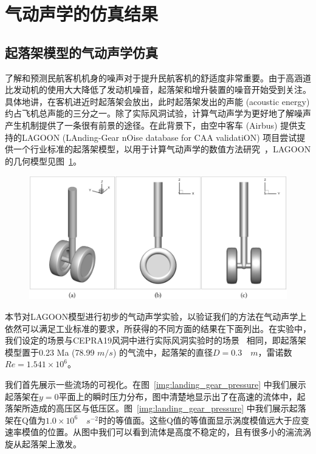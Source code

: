 \section{气动声学的仿真结果}
\subsection{起落架模型的气动声学仿真}
了解和预测民航客机机身的噪声对于提升民航客机的舒适度非常重要。由于高涵道比发动机的使用大大降低了发动机噪音，起落架和增升裝置的噪音开始受到关注。具体地讲，在客机进近时起落架会放出，此时起落架发出的声能 (acoustic energy) 约占飞机总声能的三分之一。除了实际风洞试验，计算气动声学为更好地了解噪声产生机制提供了一条很有前景的途径。在此背景下，由空中客车 (Airbus) 提供支持的LAGOON (LAnding-Gear nOise database for CAA validatiON) 项目尝试提供一个行业标准的起落架模型，以用于计算气动声学的数值方法研究~\citep{doi:10.2514/6.2008-2816, doi:10.2514/6.2009-3277}，LAGOON的几何模型见图~\ref{img:landing_gear_model}。

\begin{figure}[!htbp]
  \centering
    \includegraphics[width=0.9\columnwidth]{figures/landing_gear_model.png}
  \label{img:landing_gear_model}
\end{figure}

本节对LAGOON模型进行初步的气动声学实验，以验证我们的方法在气动声学上依然可以满足工业标准的要求，所获得的不同方面的结果在下面列出。在实验中，我们设定的场景与CEPRA19风洞中进行实际风洞实验时的场景~\citep{doi:10.2514/6.2015-2993} 相同，即起落架模型置于0.23 Ma (78.99 $m/s$) 的气流中，起落架的直径$D=0.3 \quad m$，雷诺数$Re=1.541\times 10^6$。

我们首先展示一些流场的可视化。在图~\ref{img:landing_gear_pressure} 中我们展示起落架在$y=0$平面上的瞬时压力分布，图中清楚地显示出了在高速的流体中，起落架所造成的高压区与低压区。图~\ref{img:landing_gear_pressure} 中我们展示起落架在Q值为$1.0\times 10^6 \quad s^{-2}$时的等值面。这些Q值的等值面显示涡度模值远大于应变速率模值的位置。从图中我们可以看到流体是高度不稳定的，且有很多小的湍流涡旋从起落架上激发。

